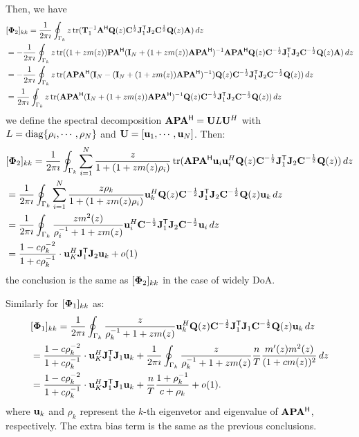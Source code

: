 \documentclass[11pt,a4paper]{article}
\begin{document}
Then, we have
\begin{align*}
     &[\bPhi_2]_{kk} = \frac1{2 \pi \imath} \oint_{\Gamma_k} z \tr (  \mathbf{T}_1^{-1} \A^\H \Q(z)\C^{\frac{1}{2}}\J^\T_1\J_2\C^{\frac{1}{2}}\Q(z)\A)\,dz \\ 
     &= -\frac1{2 \pi \imath} \oint_{\Gamma_k} z \tr ( (1+zm(z))\P\A^\H (\I_N +(1+zm(z))\A\P\A^\H)^{-1}\A\P \A^\H \Q(z)\C^{-\frac{1}{2}}\J^\T_1\J_2\C^{-\frac{1}{2}}\Q(z)\A )\,dz \\ 
     &= -\frac1{2 \pi \imath} \oint_{\Gamma_k} z\tr ( \A \P\A^\H (\I_N - (\I_N +(1+zm(z))\A\P\A^\H)^{-1} )\Q(z)\C^{-\frac{1}{2}}\J^\T_1\J_2\C^{-\frac{1}{2}}\Q(z))\,dz \\
     &= \frac1{2 \pi \imath} \oint_{\Gamma_k} z\tr ( \A \P\A^\H(\I_N +(1+zm(z))\A\P\A^\H)^{-1} \Q(z)\C^{-\frac{1}{2}}\J^\T_1\J_2\C^{-\frac{1}{2}}\Q(z))\,dz 
\end{align*}
we define the spectral decomposition $\A \P\A^\H = \U L \U^H$ with $L = \diag\{\rho_i,\cdots,\rho_N\}$ and $\U=[\uu_1,\cdots,\uu_N]$. 
Then:
\begin{align*}
     &[\bPhi_2]_{kk} = \frac1{2 \pi \imath} \oint_{\Gamma_k} \sum_{i=1}^N \frac{z}{1+(1+zm(z)\rho_i)}\tr ( \A \P\A^\H\uu_i\uu_i^H\Q(z)\C^{-\frac{1}{2}}\J^\T_1\J_2\C^{-\frac{1}{2}}\Q(z))\,dz  \\
     &= \frac1{2 \pi \imath} \oint_{\Gamma_k} \sum_{i=1}^N \frac{z \rho_k}{1+(1+zm(z)\rho_i)} \uu_k^H\Q(z)\C^{-\frac{1}{2}}\J^\T_1\J_2\C^{-\frac{1}{2}}\Q(z) \uu_k \,dz \\
     &= \frac1{2 \pi \imath} \oint_{\Gamma_k} \frac{zm^2(z)}{\rho^{-1}_i+1+zm(z)} \uu_i^H\C^{-\frac{1}{2}}\J^\T_1\J_2\C^{-\frac{1}{2}} \uu_i \,dz \\
     &= \frac{1- c \rho_k^{-2}}{ 1 + c \rho_k^{-1} } \cdot \uu_K^H \J_1^\T \J_2 \uu_k + o(1)
\end{align*}
the conclusion is the same as $[\bPhi_2]_{kk}$ in the case of widely DoA.

Similarly for $[\bPhi_1]_{kk}$ as:
\begin{align*}
    &[\bPhi_1]_{kk} = \frac1{2 \pi \imath} \oint_{\Gamma_k} \frac{z}{\rho^{-1}_k+ 1+zm(z)} \uu_k^H\Q(z)\C^{-\frac{1}{2}}\J^\T_1\J_1\C^{-\frac{1}{2}}\Q(z) \uu_k \,dz \\
    &= \frac{1- c \rho_k^{-2}}{ 1 + c \rho_k^{-1} } \cdot \uu_K^H \J_1^\T \J_1 \uu_k + \frac1{2 \pi \imath} \oint_{\Gamma_k} \frac{z}{\rho^{-1}_k+ 1+zm(z)} \frac{n}{T} \frac{m'(z)m^2(z)}{(1+cm(z))^2} \, dz \\
    &= \frac{1- c \rho_k^{-2}}{ 1 + c \rho_k^{-1} } \cdot \uu_K^H \J_1^\T \J_1 \uu_k + \frac{n}T \frac{1+\rho_k^{-1}}{c+\rho_k} + o(1).
\end{align*}
where $\uu_k$ and $\rho_k$ represent the $k$-th eigenvetor and eigenvalue of $\A\P\A^\H$, respectively.
The extra bias term is the same as the previous conclusions.
\end{document}
